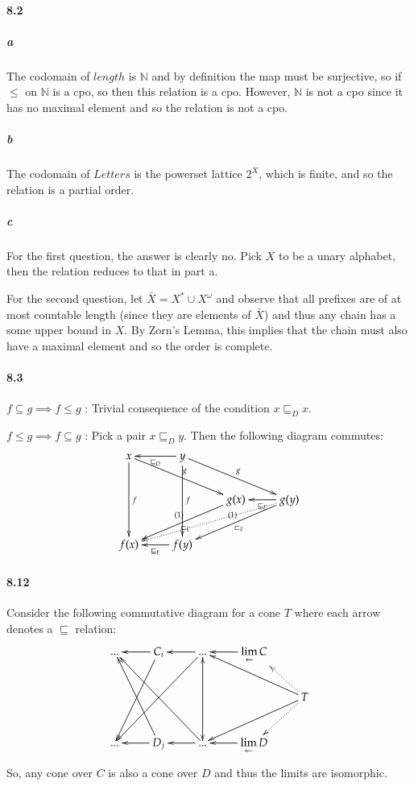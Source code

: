 \documentclass{article}
\begin{document}
\newcommand{\N}{\mathbb{N}}

\paragraph{8.2}

\subparagraph{a}
The codomain of $length$ is $\N$ and by definition the map must be surjective, so if $\leq$ on $\N$ is a cpo, so then this relation is a cpo.  However, $\N$ is not a cpo since it has no maximal element and so the relation is not a cpo.

\subparagraph{b}
The codomain of $Letters$ is the powerset lattice $2^{X}$, which is finite, and so the relation is a partial order.

\subparagraph{c}
For the first question, the answer is clearly no.  Pick $X$ to be a unary alphabet, then the relation reduces to that in part a.

For the second question, let $\bar{X} = X^* \cup X^{\omega}$ and observe that all prefixes are of at most countable length (since they are elements of $\bar{X}$) and thus any chain has a some upper bound in $X$.  By Zorn's Lemma, this implies that the chain must also have a maximal element and so the order is complete.

\paragraph{8.3}

$f \subseteq g \implies f \leq g$ :  Trivial consequence of the condition $x \sqsubseteq_D x$.

$f \leq g \implies f \subseteq g$ : Pick a pair $x \sqsubseteq_D y$.  Then the following diagram commutes:
\[
\xymatrix{
x \ar[dd]^f \ar[rrd]^g
& y \ar[l]^{\sqsubseteq_D} \ar[dd]^f \ar[rrd]^g \\
&
& g(x) \ar[lld]^{\sqsubset_E}_{(1)}
& g(y) \ar[l]^{\sqsubseteq_E} \ar[lld]^{\sqsubset_E}_{(1)} \ar@{.>}[llld] \\
f(x) 
& f(y) \ar[l]^{\sqsubseteq_E} }
\]

\paragraph{8.12}
Consider the following commutative diagram for a cone $T$ where each arrow denotes a $\sqsubseteq$ relation:
\[
\xymatrix{
  ...
& C_i \ar[l] \ar[ddl]
& ... \ar[l] \ar[ddll]
& {\mathop{\text{lim}} \limits_{\leftarrow} C} \ar[l] \\
 & & & & T \ar[ull] \ar[dll] \ar@{.>}[ul] \ar@{.>}[dl] \\
  ...
& D_j \ar[l] \ar[uul]
& ... \ar[l] \ar@{<->}[uu] \ar[uull]
& {\mathop{\text{lim}} \limits_{\leftarrow} D} \ar[l] 
}
\]
So, any cone over $C$ is also a cone over $D$ and thus the limits are isomorphic.
\end{document}
